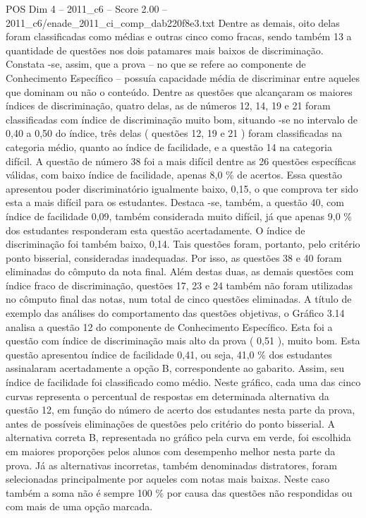 \begin{textsample}{POS Dim 4 – 2011\_c6 – Score 2.00 – 2011\_c6/enade\_2011\_ci\_comp\_dab220f8e3.txt}
Dentre as demais, oito delas foram classificadas como médias e outras cinco como fracas, sendo também 13 a quantidade de questões nos dois patamares mais baixos de discriminação.
Constata -se, assim, que a prova – no que se refere ao componente de Conhecimento Específico – possuía capacidade média de discriminar entre aqueles que dominam ou não o conteúdo.
Dentre as questões que alcançaram os maiores índices de discriminação, quatro delas, as de números 12, 14, 19 e 21 foram classificadas com índice de discriminação muito bom, situando -se no intervalo de 0,40 a 0,50 do índice, três delas ( questões 12, 19 e 21 ) foram classificadas na categoria médio, quanto ao índice de facilidade, e a questão 14 na categoria difícil.
A questão de número 38 foi a mais difícil dentre as 26 questões específicas válidas, com baixo índice de facilidade, apenas 8,0 \% de acertos.
Essa questão apresentou poder discriminatório igualmente baixo, 0,15, o que comprova ter sido esta a mais difícil para os estudantes.
Destaca -se, também, a questão 40, com índice de facilidade 0,09, também considerada muito difícil, já que apenas 9,0 \% dos estudantes responderam esta questão acertadamente.
O índice de discriminação foi também baixo, 0,14.
Tais questões foram, portanto, pelo critério ponto bisserial, consideradas inadequadas.
Por isso, as questões 38 e 40 foram eliminadas do cômputo da nota final.
Além destas duas, as demais questões com índice fraco de discriminação, questões 17, 23 e 24 também não foram utilizadas no cômputo final das notas, num total de cinco questões eliminadas.
A título de exemplo das análises do comportamento das questões objetivas, o Gráfico 3.14 analisa a questão 12 do componente de Conhecimento Específico.
Esta foi a questão com índice de discriminação mais alto da prova ( 0,51 ), muito bom.
Esta questão apresentou índice de facilidade 0,41, ou seja, 41,0 \% dos estudantes assinalaram acertadamente a opção B, correspondente ao gabarito.
Assim, seu índice de facilidade foi classificado como médio.
Neste gráfico, cada uma das cinco curvas representa o percentual de respostas em determinada alternativa da questão 12, em função do número de acerto dos estudantes nesta parte da prova, antes de possíveis eliminações de questões pelo critério do ponto bisserial.
A alternativa correta B, representada no gráfico pela curva em verde, foi escolhida em maiores proporções pelos alunos com desempenho melhor nesta parte da prova.
Já as alternativas incorretas, também denominadas distratores, foram selecionadas principalmente por aqueles com notas mais baixas.
Neste caso também a soma não é sempre 100 \% por causa das questões não respondidas ou com mais de uma opção marcada.

\end{textsample}

